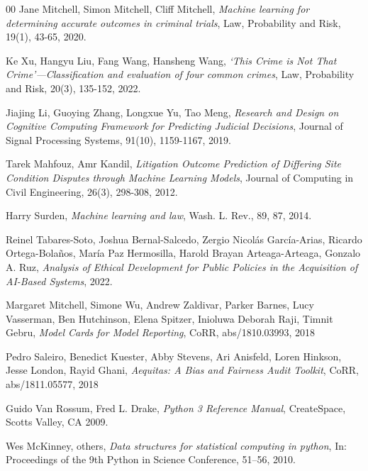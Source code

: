 \documentclass[fleqn,10pt]{wlscirep}
\begin{document}
%
\begin{thebibliography}{00}
  Jane Mitchell, Simon Mitchell, Cliff Mitchell,
  \textit{{Machine learning for determining accurate outcomes in criminal trials}},
  Law, Probability and Risk,
  19(1),
  43-65,
  2020.


  Ke Xu, Hangyu Liu, Fang Wang, Hansheng Wang,
  \textit{{‘This Crime is Not That Crime’—Classification and evaluation of four common crimes}},
  Law, Probability and Risk,
  20(3),
  135-152,
  2022.


  Jiajing Li, Guoying Zhang, Longxue Yu, Tao Meng,
  \textit{Research and Design on Cognitive Computing Framework for Predicting Judicial Decisions},
  Journal of Signal Processing Systems,
  91(10),
  1159-1167,
  2019.


  Tarek Mahfouz, Amr Kandil,
  \textit{Litigation Outcome Prediction of Differing Site Condition Disputes through Machine Learning Models},
  Journal of Computing in Civil Engineering,
  26(3),
  298-308,
  2012.


  Harry Surden,
  \textit{Machine learning and law},
  Wash. L. Rev.,
  89,
  87,
  2014.


  Reinel Tabares-Soto, Joshua Bernal-Salcedo, Zergio Nicol\'as Garc\'ia-Arias, Ricardo Ortega-Bola\~{n}os, Mar\'ia Paz Hermosilla, Harold Brayan Arteaga-Arteaga, Gonzalo A. Ruz,
  \textit{Analysis of Ethical Development for Public Policies in the Acquisition of AI-Based Systems},
  2022.


  Margaret Mitchell, Simone Wu, Andrew Zaldivar, Parker Barnes, Lucy Vasserman, Ben Hutchinson, Elena Spitzer, Inioluwa Deborah Raji, Timnit Gebru,
  \textit{Model Cards for Model Reporting},
  CoRR,
  abs/1810.03993,
  {2018}     %


  Pedro Saleiro, Benedict Kuester, Abby Stevens, Ari Anisfeld, Loren Hinkson, Jesse London, Rayid Ghani,
  \textit{Aequitas: {A} Bias and Fairness Audit Toolkit},
  CoRR,
  abs/1811.05577,
  {2018}   %


  Guido Van Rossum, Fred L. Drake,
  \textit{Python 3 Reference Manual},
  CreateSpace, {Scotts Valley, CA}  %
  2009.


  Wes McKinney, others,
  \textit{Data structures for statistical computing in python},
  In: Proceedings of the 9th Python in Science Conference,
  51--56,
  2010.



\end{thebibliography}
\end{document}
